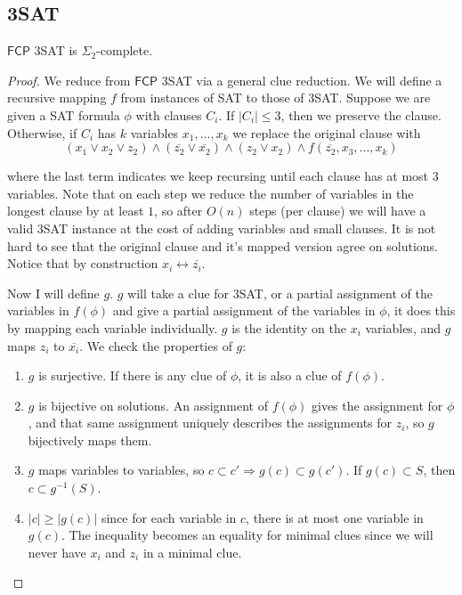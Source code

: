 \documentclass[runningheads,a4paper]{llncs}
\begin{document}
\subsection{3SAT}

\begin{theorem}
$\mathsf{FCP}$ 3SAT is $\Sigma_2$-complete. 
\end{theorem} 

\begin{proof}
We reduce from $\mathsf{FCP}$ 3SAT via a general clue reduction. We will define a recursive mapping $f$ from instances of SAT to those of 3SAT. Suppose we are given a SAT formula $\phi$ with clauses $C_i$. If $|C_i| \leq 3$, then we preserve the clause. Otherwise, if $C_i$ has $k$ variables $x_1,...,x_k$ we replace the original clause with 
\[ 
(x_1 \vee x_2 \vee z_2) \wedge (\overline{z_2} \vee \overline{x_2}) \wedge (z_2 \vee x_2) \wedge f(\overline{z_2}, x_3, ..., x_k) 
\]

where the last term indicates we keep recursing until each clause has at most $3$ variables. Note that on each step we reduce the number of variables in the longest clause by at least $1$, so after $O(n)$ steps (per clause) we will have a valid 3SAT instance at the cost of adding variables and small clauses. It is not hard to see that the original clause and it's mapped version agree on solutions. Notice that by construction $x_i \leftrightarrow \overline{z_i}$. 

Now I will define $g$. $g$ will take a clue for 3SAT, or a partial assignment of the variables in $f(\phi)$ and give a partial assignment of the variables in $\phi$, it does this by mapping each variable individually. $g$ is the identity on the $x_i$ variables, and $g$ maps $z_i$ to $\overline{x_i}$. We check the properties of $g$:
\begin{enumerate}
\item $g$ is surjective. If there is any clue of $\phi$, it is also a clue of $f(\phi)$. 
\item $g$ is bijective on solutions. An assignment of $f(\phi)$ gives the assignment for $\phi$, and that same assignment uniquely describes the assignments for $z_i$, so $g$ bijectively maps them.
\item $g$ maps variables to variables, so $c \subset c' \Rightarrow g(c) \subset g(c')$. If $g(c) \subset S$, then $c \subset g^{-1}(S)$. 
\item $|c| \geq |g(c)|$ since for each variable in $c$, there is at most one variable in $g(c)$. The inequality becomes an equality for minimal clues since we will never have $x_i$ and $z_i$ in a minimal clue.
\end{enumerate}
\end{proof}
\end{document}
